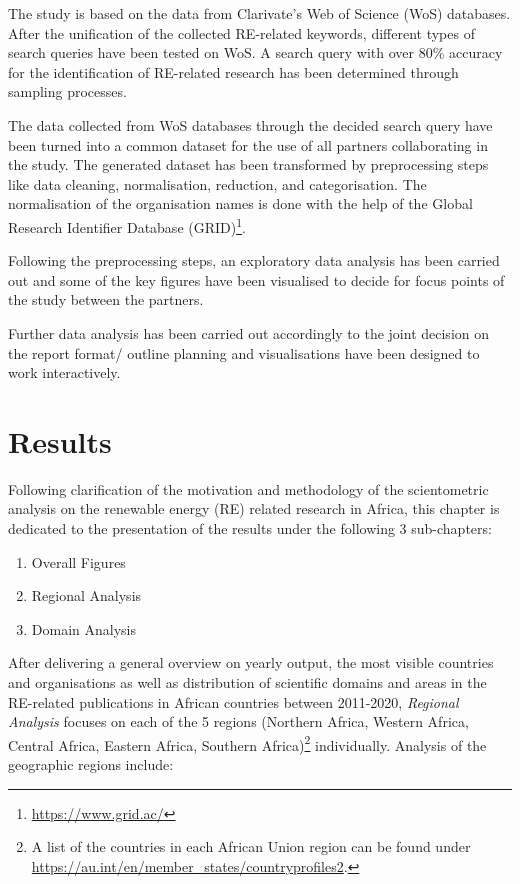 \documentclass[
]{book}
\providecommand{\tightlist}{%
  \setlength{\itemsep}{0pt}\setlength{\parskip}{0pt}}
\renewcommand{\href}[2]{#2\footnote{\url{#1}}}
\begin{document}
The study is based on the data from Clarivate's Web of Science (WoS) databases. After the unification of the collected RE-related keywords, different types of search queries have been tested on WoS. A search query with over 80\% accuracy for the identification of RE-related research has been determined through sampling processes.

The data collected from WoS databases through the decided search query have been turned into a common dataset for the use of all partners collaborating in the study. The generated dataset has been transformed by preprocessing steps like data cleaning, normalisation, reduction, and categorisation. The normalisation of the organisation names is done with the help of the \href{https://www.grid.ac/}{Global Research Identifier Database (GRID)}.

Following the preprocessing steps, an exploratory data analysis has been carried out and some of the key figures have been visualised to decide for focus points of the study between the partners.

Further data analysis has been carried out accordingly to the joint decision on the report format/ outline planning and visualisations have been designed to work interactively.

\hypertarget{results}{%
\chapter{Results}\label{results}}

Following clarification of the motivation and methodology of the
scientometric analysis on the renewable energy (RE) related research in Africa,
this chapter is dedicated to the presentation of the results under the following
3 sub-chapters:

\begin{enumerate}
\def\labelenumi{\arabic{enumi}.}
\tightlist
\item
  Overall Figures
\item
  Regional Analysis
\item
  Domain Analysis
\end{enumerate}

After delivering a general overview on yearly output, the most visible
countries and organisations as well as distribution of scientific domains and
areas in the RE-related publications in African countries between 2011-2020, \emph{Regional
Analysis} focuses on each of the 5 regions (Northern Africa, Western Africa, Central Africa,
Eastern Africa, Southern Africa)\footnote{A list of the countries in each African Union region can
  be found under \url{https://au.int/en/member_states/countryprofiles2}.} individually. Analysis of the geographic regions
include:
\end{document}
